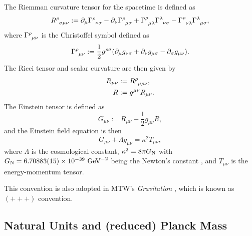 \documentclass{article}
\begin{document}
            The Riemman curvature tensor for the spacetime is defined as \cite[Eq.~(3.4)]{Carroll:2004st}
            \begin{equation}
                R\indices{^\rho_{\sigma\mu\nu}} := \partial_\mu \Gamma\indices{^\rho_{\nu\sigma}} - \partial_\nu \Gamma\indices{^\rho_{\mu\sigma}} + \Gamma\indices{^\rho_{\mu\lambda}} \Gamma\indices{^\lambda_{\nu\sigma}} - \Gamma\indices{^\rho_{\nu\lambda}} \Gamma\indices{^\lambda_{\mu\sigma}},
            \end{equation}
            where $\Gamma\indices{^\rho_{\mu\nu}}$ is the Christoffel symbol defined as \cite[Eq.~(3.1)]{Carroll:2004st}
            \begin{equation}
                \Gamma\indices{^\rho_{\mu\nu}} := \frac{1}{2} g^{\rho\sigma} \qty(\partial_\mu g_{\nu\sigma} + \partial_\nu g_{\mu\sigma} - \partial_\sigma g_{\mu\nu}).
            \end{equation}
            The Ricci tensor and scalar curvature are then given by \cite[Eqs.~(3.144) and (3.146)]{Carroll:2004st}
            \begin{align}
                R_{\mu\nu} & := R\indices{^\rho_{\mu\rho\nu}}, \\
                R & := g^{\mu\nu} R_{\mu\nu}.
            \end{align}
            The Einstein tensor is defined as \cite[Eq.~(3.151)]{Carroll:2004st}
            \begin{equation}
                G_{\mu\nu} := R_{\mu\nu} - \frac{1}{2} g_{\mu\nu} R,
            \end{equation}
            and the Einstein field equation is then \cite[Eq.~(4.100)]{Carroll:2004st}
            \begin{equation}
                G_{\mu\nu} + \Lambda g_{\mu\nu} = \kappa^2 T_{\mu\nu},
            \end{equation}
            where $\Lambda$ is the cosmological constant, $\kappa^2 = 8 \pi G_\mathrm{N}$ \cite[Eq.~(2.1)]{Basile:2024oms} with $G_\mathrm{N} = 6.70883(15) \times 10^{-39} ~ \mathrm{G}\mathrm{eV}^{-2}$ being the Newton's constant \cite{ParticleDataGroup:2024cfk}, and $T_{\mu\nu}$ is the energy-momentum tensor.

            This convention is also adopted in MTW's \textit{Gravitation} \cite{Misner:1973prb}, which is known as $(+ + +)$ convention.

        \subsection{Natural Units and (reduced) Planck Mass}
\end{document}

